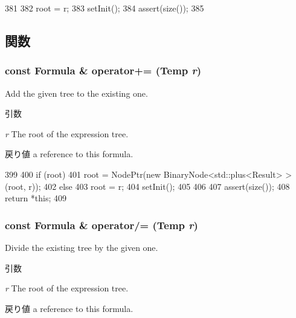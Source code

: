 \begin{DoxyCode}
381 {
382     root = r;
383     setInit();
384     assert(size());
385 }
\end{DoxyCode}


\subsection{関数}
\hypertarget{classStats_1_1Formula_a42c7af4fd136e07033823e9965715d7b}{
\subsubsection[{operator+=}]{\setlength{\rightskip}{0pt plus 5cm}const {\bf Formula} \& operator+= ({\bf Temp} {\em r})}}
\label{classStats_1_1Formula_a42c7af4fd136e07033823e9965715d7b}
Add the given tree to the existing one. 
\begin{DoxyParams}{引数}
\item[{\em r}]The root of the expression tree. \end{DoxyParams}
\begin{DoxyReturn}{戻り値}
a reference to this formula. 
\end{DoxyReturn}



\begin{DoxyCode}
399 {
400     if (root)
401         root = NodePtr(new BinaryNode<std::plus<Result> >(root, r));
402     else {
403         root = r;
404         setInit();
405     }
406 
407     assert(size());
408     return *this;
409 }
\end{DoxyCode}
\hypertarget{classStats_1_1Formula_a90b02014636934b23364214dcceff3c4}{
\subsubsection[{operator/=}]{\setlength{\rightskip}{0pt plus 5cm}const {\bf Formula} \& operator/= ({\bf Temp} {\em r})}}
\label{classStats_1_1Formula_a90b02014636934b23364214dcceff3c4}
Divide the existing tree by the given one. 
\begin{DoxyParams}{引数}
\item[{\em r}]The root of the expression tree. \end{DoxyParams}
\begin{DoxyReturn}{戻り値}
a reference to this formula. 
\end{DoxyReturn}



